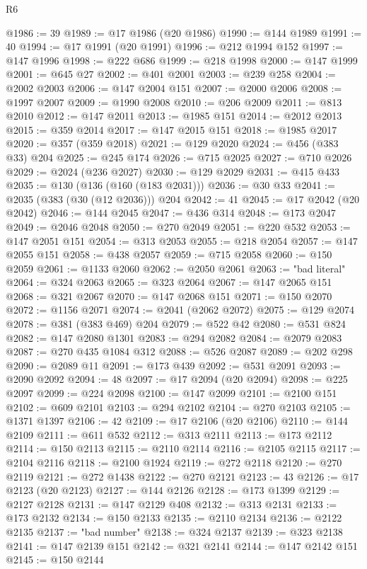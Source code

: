 \begin{lexlean}{R6}
\begin{coremodule}
@1986 := 39
@1989 := @17 @1986 (@20 @1986)
@1990 := @144 @1989
@1991 := 40
@1994 := @17 @1991 (@20 @1991)
@1996 := @212 @1994 @152
@1997 := @147 @1996
@1998 := @222 @686
@1999 := @218 @1998
@2000 := @147 @1999
@2001 := @645 @27
@2002 := @401 @2001
@2003 := @239 @258
@2004 := @2002 @2003
@2006 := @147 @2004 @151
@2007 := @2000 @2006
@2008 := @1997 @2007
@2009 := @1990 @2008
@2010 := @206 @2009
@2011 := @813 @2010
@2012 := @147 @2011
@2013 := @1985 @151
@2014 := @2012 @2013
@2015 := @359 @2014
@2017 := @147 @2015 @151
@2018 := @1985 @2017
@2020 := @357 (@359 @2018)
@2021 := @129 @2020
@2024 := @456 (@383 @33) @204
@2025 := @245 @174
@2026 := @715 @2025
@2027 := @710 @2026
@2029 := @2024 (@236 @2027)
@2030 := @129 @2029
@2031 := @415 @433
@2035 := @130 (@136 (@160 (@183 @2031)))
@2036 := @30 @33
@2041 := @2035 (@383 (@30 (@12 @2036))) @204
@2042 := 41
@2045 := @17 @2042 (@20 @2042)
@2046 := @144 @2045
@2047 := @436 @314
@2048 := @173 @2047
@2049 := @2046 @2048
@2050 := @270 @2049
@2051 := @220 @532
@2053 := @147 @2051 @151
@2054 := @313 @2053
@2055 := @218 @2054
@2057 := @147 @2055 @151
@2058 := @438 @2057
@2059 := @715 @2058
@2060 := @150 @2059
@2061 := @1133 @2060
@2062 := @2050 @2061
@2063 := "bad literal"
@2064 := @324 @2063
@2065 := @323 @2064
@2067 := @147 @2065 @151
@2068 := @321 @2067
@2070 := @147 @2068 @151
@2071 := @150 @2070
@2072 := @1156 @2071
@2074 := @2041 (@2062 @2072)
@2075 := @129 @2074
@2078 := @381 (@383 @469) @204
@2079 := @522 @42
@2080 := @531 @824
@2082 := @147 @2080 @1301
@2083 := @294 @2082
@2084 := @2079 @2083
@2087 := @270 @435 @1084 @312
@2088 := @526 @2087
@2089 := @202 @298
@2090 := @2089 @11
@2091 := @173 @439
@2092 := @531 @2091
@2093 := @2090 @2092
@2094 := 48
@2097 := @17 @2094 (@20 @2094)
@2098 := @225 @2097
@2099 := @224 @2098
@2100 := @147 @2099
@2101 := @2100 @151
@2102 := @609 @2101
@2103 := @294 @2102
@2104 := @270 @2103
@2105 := @1371 @1397
@2106 := 42
@2109 := @17 @2106 (@20 @2106)
@2110 := @144 @2109
@2111 := @611 @532
@2112 := @313 @2111
@2113 := @173 @2112
@2114 := @150 @2113
@2115 := @2110 @2114
@2116 := @2105 @2115
@2117 := @2104 @2116
@2118 := @2100 @1924
@2119 := @272 @2118
@2120 := @270 @2119
@2121 := @272 @1438
@2122 := @270 @2121
@2123 := 43
@2126 := @17 @2123 (@20 @2123)
@2127 := @144 @2126
@2128 := @173 @1399
@2129 := @2127 @2128
@2131 := @147 @2129 @408
@2132 := @313 @2131
@2133 := @173 @2132
@2134 := @150 @2133
@2135 := @2110 @2134
@2136 := @2122 @2135
@2137 := "bad number"
@2138 := @324 @2137
@2139 := @323 @2138
@2141 := @147 @2139 @151
@2142 := @321 @2141
@2144 := @147 @2142 @151
@2145 := @150 @2144

\end{coremodule}
\end{lexlean}
